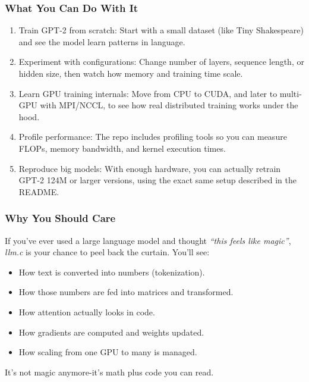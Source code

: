 \documentclass[
  letterpaper,
  DIV=11,
  numbers=noendperiod]{scrreprt}
\providecommand{\tightlist}{%
  \setlength{\itemsep}{0pt}\setlength{\parskip}{0pt}}
\begin{document}
\subsubsection{What You Can Do With It}\label{what-you-can-do-with-it}

\begin{enumerate}
\def\labelenumi{\arabic{enumi}.}
\tightlist
\item
  Train GPT-2 from scratch: Start with a small dataset (like Tiny
  Shakespeare) and see the model learn patterns in language.
\item
  Experiment with configurations: Change number of layers, sequence
  length, or hidden size, then watch how memory and training time scale.
\item
  Learn GPU training internals: Move from CPU to CUDA, and later to
  multi-GPU with MPI/NCCL, to see how real distributed training works
  under the hood.
\item
  Profile performance: The repo includes profiling tools so you can
  measure FLOPs, memory bandwidth, and kernel execution times.
\item
  Reproduce big models: With enough hardware, you can actually retrain
  GPT-2 124M or larger versions, using the exact same setup described in
  the README.
\end{enumerate}

\subsubsection{Why You Should Care}\label{why-you-should-care}

If you've ever used a large language model and thought \emph{``this
feels like magic''}, \emph{llm.c} is your chance to peel back the
curtain. You'll see:

\begin{itemize}
\tightlist
\item
  How text is converted into numbers (tokenization).
\item
  How those numbers are fed into matrices and transformed.
\item
  How attention actually looks in code.
\item
  How gradients are computed and weights updated.
\item
  How scaling from one GPU to many is managed.
\end{itemize}

It's not magic anymore-it's math plus code you can read.
\end{document}

